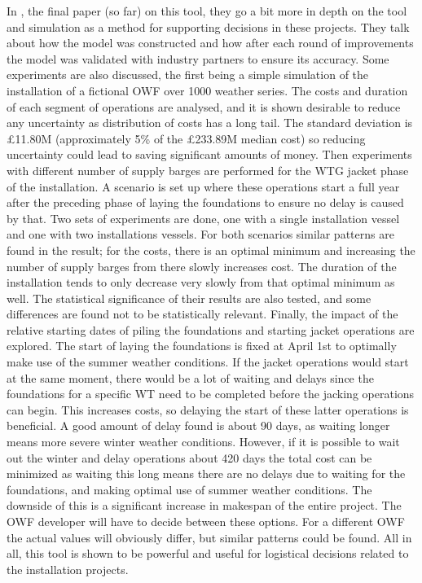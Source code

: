 \documentclass[a4paper,12pt]{article}
\begin{document}
In \cite{barlow2017using}, the final paper (so far) on this tool, they go a bit more in depth on the tool and simulation as a method for supporting decisions in these projects. They talk about how the model was constructed and how after each round of improvements the model was validated with industry partners to ensure its accuracy. Some experiments are also discussed, the first being a simple simulation of the installation of a fictional OWF over 1000 weather series. The costs and duration of each segment of operations are analysed, and it is shown desirable to reduce any uncertainty as distribution of costs has a long tail. The standard deviation is \pounds 11.80M (approximately 5\% of the \pounds 233.89M median cost) so reducing uncertainty could lead to saving significant amounts of money. Then experiments with different number of supply barges are performed for the WTG jacket phase of the installation. A scenario is set up where these operations start a full year after the preceding phase of laying the foundations to ensure no delay is caused by that. Two sets of experiments are done, one with a single installation vessel and one with two installations vessels. For both scenarios similar patterns are found in the result; for the costs, there is an optimal minimum and increasing the number of supply barges from there slowly increases cost. The duration of the installation tends to only decrease very slowly from that optimal minimum as well. The statistical significance of their results are also tested, and some differences are found not to be statistically relevant. Finally, the impact of the relative starting dates of piling the foundations and starting jacket operations are explored. The start of laying the foundations is fixed at April 1st to optimally make use of the summer weather conditions. If the jacket operations would start at the same moment, there would be a lot of waiting and delays since the foundations for a specific WT need to be completed before the jacking operations can begin. This increases costs, so delaying the start of these latter operations is beneficial. A good amount of delay found is about 90 days, as waiting longer means more severe winter weather conditions. However, if it is possible to wait out the winter and delay operations about 420 days the total cost can be minimized as waiting this long means there are no delays due to waiting for the foundations, and making optimal use of summer weather conditions. The downside of this is a significant increase in makespan of the entire project. The OWF developer will have to decide between these options. For a different OWF the actual values will obviously differ, but similar patterns could be found. All in all, this tool is shown to be powerful and useful for logistical decisions related to the installation projects. 
\end{document}
